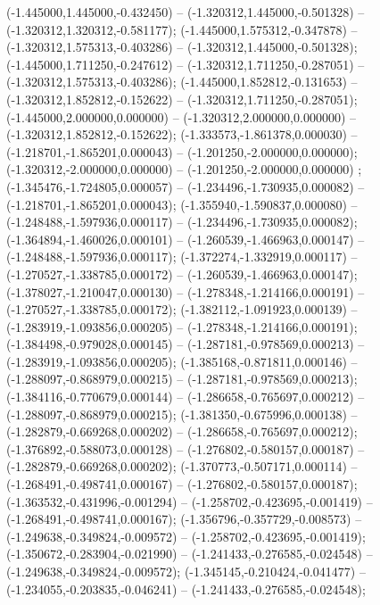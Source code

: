  (-1.445000,1.445000,-0.432450) -- (-1.320312,1.445000,-0.501328) -- (-1.320312,1.320312,-0.581177);
 (-1.445000,1.575312,-0.347878) -- (-1.320312,1.575313,-0.403286) -- (-1.320312,1.445000,-0.501328);
 (-1.445000,1.711250,-0.247612) -- (-1.320312,1.711250,-0.287051) -- (-1.320312,1.575313,-0.403286);
 (-1.445000,1.852812,-0.131653) -- (-1.320312,1.852812,-0.152622) -- (-1.320312,1.711250,-0.287051);
 (-1.445000,2.000000,0.000000) -- (-1.320312,2.000000,0.000000) -- (-1.320312,1.852812,-0.152622);
 (-1.333573,-1.861378,0.000030) -- (-1.218701,-1.865201,0.000043) -- (-1.201250,-2.000000,0.000000);
 (-1.320312,-2.000000,0.000000) -- (-1.201250,-2.000000,0.000000) ;
 (-1.345476,-1.724805,0.000057) -- (-1.234496,-1.730935,0.000082) -- (-1.218701,-1.865201,0.000043);
 (-1.355940,-1.590837,0.000080) -- (-1.248488,-1.597936,0.000117) -- (-1.234496,-1.730935,0.000082);
 (-1.364894,-1.460026,0.000101) -- (-1.260539,-1.466963,0.000147) -- (-1.248488,-1.597936,0.000117);
 (-1.372274,-1.332919,0.000117) -- (-1.270527,-1.338785,0.000172) -- (-1.260539,-1.466963,0.000147);
 (-1.378027,-1.210047,0.000130) -- (-1.278348,-1.214166,0.000191) -- (-1.270527,-1.338785,0.000172);
 (-1.382112,-1.091923,0.000139) -- (-1.283919,-1.093856,0.000205) -- (-1.278348,-1.214166,0.000191);
 (-1.384498,-0.979028,0.000145) -- (-1.287181,-0.978569,0.000213) -- (-1.283919,-1.093856,0.000205);
 (-1.385168,-0.871811,0.000146) -- (-1.288097,-0.868979,0.000215) -- (-1.287181,-0.978569,0.000213);
 (-1.384116,-0.770679,0.000144) -- (-1.286658,-0.765697,0.000212) -- (-1.288097,-0.868979,0.000215);
 (-1.381350,-0.675996,0.000138) -- (-1.282879,-0.669268,0.000202) -- (-1.286658,-0.765697,0.000212);
 (-1.376892,-0.588073,0.000128) -- (-1.276802,-0.580157,0.000187) -- (-1.282879,-0.669268,0.000202);
 (-1.370773,-0.507171,0.000114) -- (-1.268491,-0.498741,0.000167) -- (-1.276802,-0.580157,0.000187);
 (-1.363532,-0.431996,-0.001294) -- (-1.258702,-0.423695,-0.001419) -- (-1.268491,-0.498741,0.000167);
 (-1.356796,-0.357729,-0.008573) -- (-1.249638,-0.349824,-0.009572) -- (-1.258702,-0.423695,-0.001419);
 (-1.350672,-0.283904,-0.021990) -- (-1.241433,-0.276585,-0.024548) -- (-1.249638,-0.349824,-0.009572);
 (-1.345145,-0.210424,-0.041477) -- (-1.234055,-0.203835,-0.046241) -- (-1.241433,-0.276585,-0.024548);

